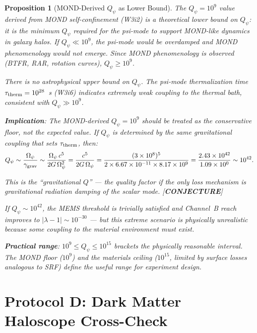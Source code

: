 \documentclass[11pt]{article}
\newcommand{\lam}{\lambda}
\newcommand{\Opsi}{\Omega_\psi}
\newcommand{\ee}[1]{\times 10^{#1}}
\newcommand{\Qpsi}{Q_\psi}
\newcommand{\lbone}{|\lam - 1|}
\newtheorem{proposition}[theorem]{Proposition}
\theoremstyle{definition}
\theoremstyle{remark}
\begin{document}
\begin{proposition}[MOND-Derived $\Qpsi$ as Lower Bound]
\label{prop:MOND_Qpsi}
The $\Qpsi = 10^9$ value derived from MOND self-confinement (W3i2)
is a \emph{theoretical lower bound} on $\Qpsi$: it is the minimum
$\Qpsi$ required for the psi-mode to support MOND-like dynamics in
galaxy halos. If $\Qpsi \ll 10^9$, the psi-mode would be overdamped
and MOND phenomenology would not emerge. Since MOND phenomenology is
observed (BTFR, RAR, rotation curves), $\Qpsi \geq 10^9$.

There is no astrophysical \emph{upper} bound on $\Qpsi$. The
psi-mode thermalization time $\tau_{\rm therm} = 10^{28}$~s (W3i6)
indicates extremely weak coupling to the thermal bath, consistent
with $\Qpsi \gg 10^9$.

\textbf{Implication}: The MOND-derived $\Qpsi = 10^9$ should be
treated as the \emph{conservative floor}, not the expected value.
If $\Qpsi$ is determined by the same gravitational coupling that
sets $\tau_{\rm therm}$, then:
\begin{equation}
\Qpsi \sim \frac{\Opsi}{\gamma_{\rm grav}}
\sim \frac{\Opsi\,c^5}{2G\,\Opsi^2}
= \frac{c^5}{2G\,\Opsi}
= \frac{(3\ee{8})^5}{2\times 6.67\ee{-11}\times 8.17\ee{9}}
= \frac{2.43\ee{42}}{1.09\ee{0}} \sim 10^{42}.
\label{eq:Qpsi_grav}
\end{equation}

This is the ``gravitational $Q$'' --- the quality factor if the
only loss mechanism is gravitational radiation damping of the scalar
mode. [\textbf{CONJECTURE}]

If $\Qpsi \sim 10^{42}$, the MEMS threshold is trivially satisfied
and Channel~B reach improves to $\lbone \sim 10^{-30}$ --- but this
extreme scenario is physically unrealistic because \emph{some} coupling
to the material environment must exist.

\textbf{Practical range}: $10^9 \leq \Qpsi \leq 10^{15}$ brackets
the physically reasonable interval. The MOND floor ($10^9$) and the
materials ceiling ($10^{15}$, limited by surface losses analogous to
SRF) define the useful range for experiment design.
\end{proposition}

\section{Protocol D: Dark Matter Haloscope Cross-Check}
\label{sec:haloscope}
\end{document}

